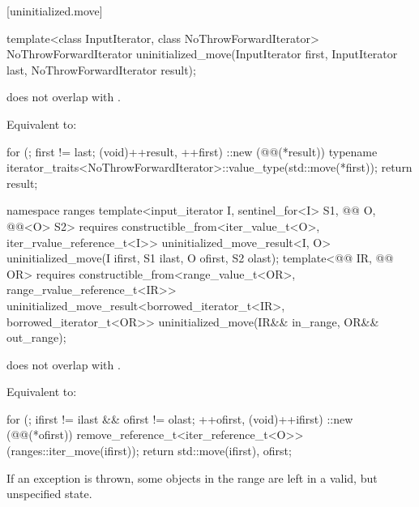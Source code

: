 [uninitialized.move]{}

%
\begin{itemdecl}
template<class InputIterator, class NoThrowForwardIterator>
  NoThrowForwardIterator uninitialized_move(InputIterator first, InputIterator last,
                                            NoThrowForwardIterator result);
\end{itemdecl}

\begin{itemdescr}
\pnum
\expects
{} does not overlap with .

\pnum
\effects
Equivalent to:
\begin{codeblock}
for (; first != last; (void)++result, ++first)
  ::new (@@(*result))
    typename iterator_traits<NoThrowForwardIterator>::value_type(std::move(*first));
return result;
\end{codeblock}
\end{itemdescr}

%
\begin{itemdecl}
namespace ranges {
  template<input_iterator I, sentinel_for<I> S1,
           @@ O, @@<O> S2>
      requires constructible_from<iter_value_t<O>, iter_rvalue_reference_t<I>>
    uninitialized_move_result<I, O>
      uninitialized_move(I ifirst, S1 ilast, O ofirst, S2 olast);
  template<@@ IR, @@ OR>
      requires constructible_from<range_value_t<OR>, range_rvalue_reference_t<IR>>
    uninitialized_move_result<borrowed_iterator_t<IR>, borrowed_iterator_t<OR>>
      uninitialized_move(IR&& in_range, OR&& out_range);
}
\end{itemdecl}

\begin{itemdescr}
\pnum
\expects
{} does not overlap with .

\pnum
\effects
Equivalent to:
\begin{codeblock}
for (; ifirst != ilast && ofirst != olast; ++ofirst, (void)++ifirst) {
  ::new (@@(*ofirst))
    remove_reference_t<iter_reference_t<O>>(ranges::iter_move(ifirst));
}
return {std::move(ifirst), ofirst};
\end{codeblock}

\pnum
\begin{note}
If an exception is thrown, some objects in the range  are
left in a valid, but unspecified state.
\end{note}
\end{itemdescr}

